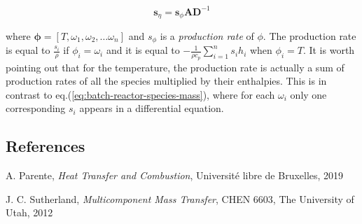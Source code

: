 \documentclass[10pt]{article}
\begin{document}
\begin{equation} \label{eq:bath-reactor-adiabatic-constant-pressure}
\mathbf{s}_{\eta} = \mathbf{s}_{\phi} \mathbf{A} \mathbf{D}^{-1}
\end{equation}


where $ \boldsymbol{\phi} = [T, \omega_1, \omega_2, \dots \omega_n]$ and $s_{\phi}$ is a \textit{production rate} of $\phi$. The production rate is equal to $\frac{s_i}{\rho}$ if $\phi_i = \omega_i$ and it is equal to $ - \frac{1}{\rho c_{p}} \sum_{i=1}^n  s_i  h_i $ when $\phi_i = T$. It is worth pointing out that for the temperature, the production rate is actually a sum of production rates of all the species multiplied by their enthalpies. This is in contrast to eq.(\ref{eq:batch-reactor-species-mass}), where for each $\omega_i$ only one corresponding $s_i$ appears in a differential equation.







\subsection*{References}

A. Parente, \textit{Heat Transfer and Combustion}, Université libre de Bruxelles, 2019

J. C. Sutherland, \textit{Multicomponent Mass Transfer}, CHEN 6603, The University of Utah, 2012
\end{document}
